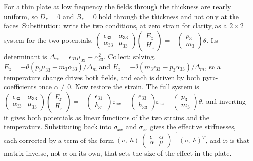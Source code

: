 \documentclass[11pt]{article}
\makeatletter
\newif\ifshowworked
\newenvironment{worked}{%
  \ifshowworked\par\smallskip\noindent\textit{Working.}\par\smallskip\else
  \setbox\z@\vbox\bgroup\fi}{\ifshowworked\par\smallskip\else\egroup\fi}
\makeatother
\begin{document}
\begin{worked}
For a thin plate at low frequency the fields through the thickness are nearly uniform, so $D_z=0$ and
$B_z=0$ hold through the thickness and not only at the faces. Substitution: write the two conditions, at
zero strain for clarity, as a $2\times2$ system for the two potentials,
$\begin{pmatrix}\epsilon_{33}&\alpha_{33}\\ \alpha_{33}&\mu_{33}\end{pmatrix}
\begin{pmatrix}E_z\\ H_z\end{pmatrix}=-\begin{pmatrix}p_3\\ m_3\end{pmatrix}\theta$.
Its determinant is $\Delta_m=\epsilon_{33}\mu_{33}-\alpha_{33}^2$.
Collect: solving, $E_z=-\theta(p_3\mu_{33}-m_3\alpha_{33})/\Delta_m$ and
$H_z=-\theta(m_3\epsilon_{33}-p_3\alpha_{33})/\Delta_m$, so a temperature change drives both fields, and
each is driven by both pyro-coefficients once $\alpha\ne0$.
Now restore the strain. The full system is
$\begin{pmatrix}\epsilon_{33}&\alpha_{33}\\ \alpha_{33}&\mu_{33}\end{pmatrix}
\begin{pmatrix}E_z\\ H_z\end{pmatrix}=-\begin{pmatrix}e_{31}\\ h_{31}\end{pmatrix}\varepsilon_{xx}
-\begin{pmatrix}e_{33}\\ h_{33}\end{pmatrix}\varepsilon_{zz}
-\begin{pmatrix}p_3\\ m_3\end{pmatrix}\theta$, and inverting it gives both potentials as linear functions
of the two strains and the temperature. Substituting back into $\sigma_{xx}$ and $\sigma_{zz}$ gives the
effective stiffnesses, each corrected by a term of the form
$(e,\ h)\,\begin{pmatrix}\epsilon&\alpha\\ \alpha&\mu\end{pmatrix}^{-1}(e,\ h)^{T}$, and it is that
matrix inverse, not $\alpha$ on its own, that sets the size of the effect in the plate.

\end{worked}
\end{document}
